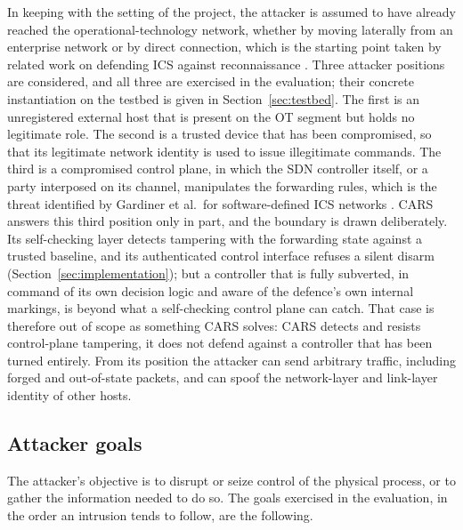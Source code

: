 In keeping with the setting of the project, the attacker is assumed to have already reached the operational-technology network, whether by moving laterally from an enterprise network or by direct connection, which is the starting point taken by related work on defending ICS against reconnaissance \cite{samanis2025phd}. Three attacker positions are considered, and all three are exercised in the evaluation; their concrete instantiation on the testbed is given in Section~\ref{sec:testbed}. The first is an unregistered external host that is present on the OT segment but holds no legitimate role. The second is a trusted device that has been compromised, so that its legitimate network identity is used to issue illegitimate commands. The third is a compromised control plane, in which the SDN controller itself, or a party interposed on its channel, manipulates the forwarding rules, which is the threat identified by Gardiner et al.\ for software-defined ICS networks \cite{gardiner2021controller}. CARS answers this third position only in part, and the boundary is drawn deliberately. Its self-checking layer detects tampering with the forwarding state against a trusted baseline, and its authenticated control interface refuses a silent disarm (Section~\ref{sec:implementation}); but a controller that is fully subverted, in command of its own decision logic and aware of the defence's own internal markings, is beyond what a self-checking control plane can catch. That case is therefore out of scope as something CARS solves: CARS detects and resists control-plane tampering, it does not defend against a controller that has been turned entirely. From its position the attacker can send arbitrary traffic, including forged and out-of-state packets, and can spoof the network-layer and link-layer identity of other hosts.

\subsection{Attacker goals}

The attacker's objective is to disrupt or seize control of the physical process, or to gather the information needed to do so. The goals exercised in the evaluation, in the order an intrusion tends to follow, are the following.

